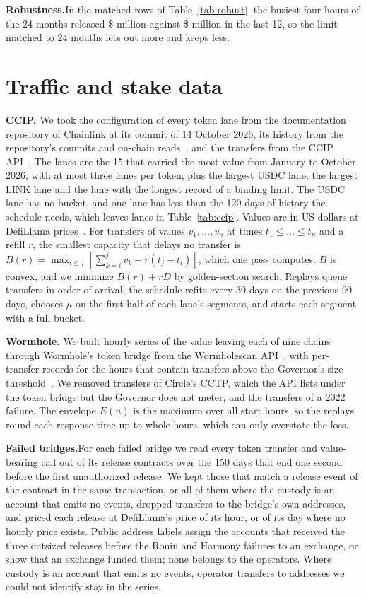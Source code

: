 \documentclass[conference,compsoc]{IEEEtran}
\numberwithin{equation}{section}
\theoremstyle{plain}
\theoremstyle{definition}
\theoremstyle{remark}
\newcommand{\runin}[1]{\par\smallskip\noindent\textbf{#1.}\enspace}
\begin{document}
\runin{Robustness}In the matched rows of Table~\ref{tab:robust}, the busiest four hours of the 24 months released \$\matchEnvFourHFullTwentyFourM{} million against \$\matchEnvFourHFullM{} million in the last 12, so the limit matched to 24 months lets out more and keeps less.


\section{Traffic and stake data}\label{app:methods}

\runin{CCIP} We took the configuration of every token lane from the documentation repository of Chainlink at its commit of 14 October 2026, its history from the repository's commits and on-chain reads~\cite{chainlink_lanes}, and the transfers from the CCIP API~\cite{ccip_api}. The \ccipSelLanes{} lanes are the 15 that carried the most value from January to October 2026, with at most three lanes per token, plus the largest USDC lane, the largest LINK lane and the lane with the longest record of a binding limit. The USDC lane has no bucket, and one lane has less than the 120 days of history the schedule needs, which leaves \ccipInLanes{} lanes in Table~\ref{tab:ccip}. Values are in US dollars at DefiLlama prices~\cite{defillama_coins}. For transfers of values $v_1, \dots, v_n$ at times $t_1 \le \dots \le t_n$ and a refill $r$, the smallest capacity that delays no transfer is $B(r) = \max_{i \le j} [\sum_{k=i}^{j} v_k - r(t_j - t_i)]$, which one pass computes. $B$ is convex, and we minimize $B(r) + rD$ by golden-section search. Replays queue transfers in order of arrival; the schedule refits every 30 days on the previous 90 days, chooses $\mu$ on the first half of each lane's segments, and starts each segment with a full bucket.

\runin{Wormhole} We built hourly series of the value leaving each of nine chains through Wormhole's token bridge from the Wormholescan API~\cite{wormholescan}, with per-transfer records for the hours that contain transfers above the Governor's size threshold~\cite{wormhole_governor}. We removed transfers of Circle's CCTP, which the API lists under the token bridge but the Governor does not meter, and the transfers of a 2022 failure. The envelope $E(u)$ is the maximum over all start hours, so the replays round each response time up to whole hours, which can only overstate the loss.

\runin{Failed bridges}For each failed bridge we read every token transfer and value-bearing call out of its release contracts over the 150 days that end one second before the first unauthorized release. We kept those that match a release event of the contract in the same transaction, or all of them where the custody is an account that emits no events, dropped transfers to the bridge's own addresses, and priced each release at DefiLlama's price of its hour, or of its day where no hourly price exists. Public address labels assign the accounts that received the three outsized releases before the Ronin and Harmony failures to an exchange, or show that an exchange funded them; none belongs to the operators. Where custody is an account that emits no events, operator transfers to addresses we could not identify stay in the series.
\end{document}
